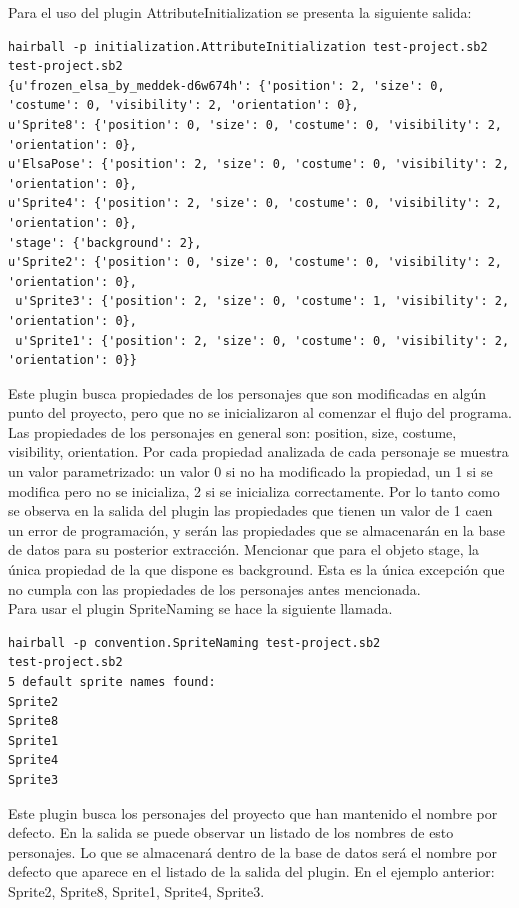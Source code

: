 \documentclass[a4paper, 12pt]{book}
\begin{document}
Para el uso del plugin AttributeInitialization se presenta la siguiente salida:

\begingroup
\fontsize{8pt}{8pt}\selectfont
\begin{verbatim}
hairball -p initialization.AttributeInitialization test-project.sb2 
test-project.sb2
{u'frozen_elsa_by_meddek-d6w674h': {'position': 2, 'size': 0, 'costume': 0, 'visibility': 2, 'orientation': 0}, 
u'Sprite8': {'position': 0, 'size': 0, 'costume': 0, 'visibility': 2, 'orientation': 0}, 
u'ElsaPose': {'position': 2, 'size': 0, 'costume': 0, 'visibility': 2, 'orientation': 0}, 
u'Sprite4': {'position': 2, 'size': 0, 'costume': 0, 'visibility': 2, 'orientation': 0}, 
'stage': {'background': 2}, 
u'Sprite2': {'position': 0, 'size': 0, 'costume': 0, 'visibility': 2, 'orientation': 0},
 u'Sprite3': {'position': 2, 'size': 0, 'costume': 1, 'visibility': 2, 'orientation': 0},
 u'Sprite1': {'position': 2, 'size': 0, 'costume': 0, 'visibility': 2, 'orientation': 0}}
\end{verbatim}
\endgroup

Este plugin busca propiedades de los personajes que son modificadas en algún punto del 
proyecto, pero que no se inicializaron al comenzar el flujo del programa. Las propiedades 
de los personajes en general son: position, size, costume, visibility, orientation. 
Por cada propiedad analizada de cada personaje se muestra un valor parametrizado: un valor 
0 si no ha modificado la propiedad, un 1 si se modifica pero no se inicializa, 2 si se inicializa
correctamente. Por lo tanto como se observa en la salida del plugin las propiedades que tienen
 un valor de 1 caen un error de programación, y serán las propiedades que se almacenarán en la
base de datos para su posterior extracción. Mencionar que para el objeto stage, la única 
propiedad de la que dispone es background. Esta es la única excepción que no cumpla con 
las propiedades de los personajes antes mencionada. \\


Para usar el plugin SpriteNaming se hace la siguiente llamada.
\begingroup
\fontsize{8pt}{9pt}\selectfont
\begin{verbatim}
hairball -p convention.SpriteNaming test-project.sb2 
test-project.sb2
5 default sprite names found:
Sprite2
Sprite8
Sprite1
Sprite4
Sprite3
\end{verbatim}
\endgroup

Este plugin busca los personajes del proyecto que han mantenido el nombre por defecto. En
la salida se puede observar un listado de los nombres de esto personajes. Lo que se 
almacenará dentro de la base de datos será el nombre por defecto que aparece en el listado
de la salida del plugin. En el ejemplo anterior: Sprite2, Sprite8, Sprite1, Sprite4, Sprite3. \\ \\ \\
\end{document}
